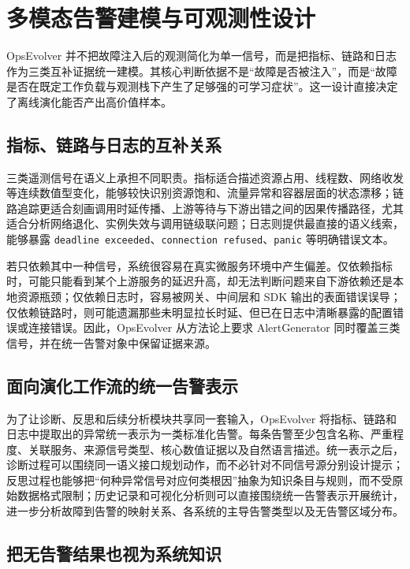 \section{多模态告警建模与可观测性设计}
\label{sec:alert_modeling_design}

OpsEvolver 并不把故障注入后的观测简化为单一信号，而是把指标、链路和日志作为三类互补证据统一建模。其核心判断依据不是“故障是否被注入”，而是“故障是否在既定工作负载与观测栈下产生了足够强的可学习症状”。这一设计直接决定了离线演化能否产出高价值样本。

\subsection{指标、链路与日志的互补关系}

三类遥测信号在语义上承担不同职责。指标适合描述资源占用、线程数、网络收发等连续数值型变化，能够较快识别资源饱和、流量异常和容器层面的状态漂移；链路追踪更适合刻画调用时延传播、上游等待与下游出错之间的因果传播路径，尤其适合分析网络退化、实例失效与调用链级联问题；日志则提供最直接的语义线索，能够暴露 \texttt{deadline exceeded}、\texttt{connection refused}、\texttt{panic} 等明确错误文本。

若只依赖其中一种信号，系统很容易在真实微服务环境中产生偏差。仅依赖指标时，可能只能看到某个上游服务的延迟升高，却无法判断问题来自下游依赖还是本地资源瓶颈；仅依赖日志时，容易被网关、中间层和 SDK 输出的表面错误误导；仅依赖链路时，则可能遗漏那些未明显拉长时延、但已在日志中清晰暴露的配置错误或连接错误。因此，OpsEvolver 从方法论上要求 AlertGenerator 同时覆盖三类信号，并在统一告警对象中保留证据来源。

\subsection{面向演化工作流的统一告警表示}

为了让诊断、反思和后续分析模块共享同一套输入，OpsEvolver 将指标、链路和日志中提取出的异常统一表示为一类标准化告警。每条告警至少包含名称、严重程度、关联服务、来源信号类型、核心数值证据以及自然语言描述。统一表示之后，诊断过程可以围绕同一语义接口规划动作，而不必针对不同信号源分别设计提示；反思过程也能够把“何种异常信号对应何类根因”抽象为知识条目与规则，而不受原始数据格式限制；历史记录和可视化分析则可以直接围绕统一告警表示开展统计，进一步分析故障到告警的映射关系、各系统的主导告警类型以及无告警区域分布。

\subsection{把无告警结果也视为系统知识}


